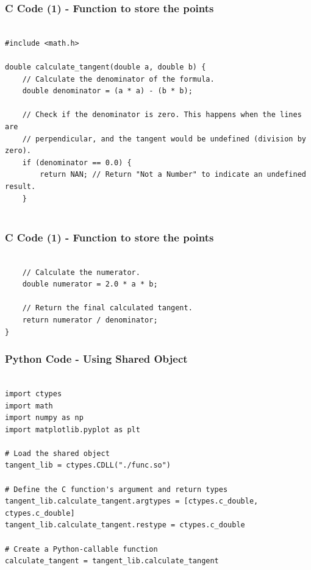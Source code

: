 \documentclass{beamer}
\begin{document}
\begin{frame}[fragile]
    \frametitle{C Code (1) - Function to store the points }

    \begin{lstlisting}

#include <math.h>

double calculate_tangent(double a, double b) {
    // Calculate the denominator of the formula.
    double denominator = (a * a) - (b * b);

    // Check if the denominator is zero. This happens when the lines are
    // perpendicular, and the tangent would be undefined (division by zero).
    if (denominator == 0.0) {
        return NAN; // Return "Not a Number" to indicate an undefined result.
    }


    \end{lstlisting}
\end{frame}

\begin{frame}[fragile]
    \frametitle{C Code (1) - Function to store the points }

    \begin{lstlisting}

    // Calculate the numerator.
    double numerator = 2.0 * a * b;

    // Return the final calculated tangent.
    return numerator / denominator;
}

    \end{lstlisting}
\end{frame}


\begin{frame}[fragile]
    \frametitle{Python Code - Using Shared Object}
    \begin{lstlisting}

import ctypes
import math
import numpy as np
import matplotlib.pyplot as plt

# Load the shared object
tangent_lib = ctypes.CDLL("./func.so")

# Define the C function's argument and return types
tangent_lib.calculate_tangent.argtypes = [ctypes.c_double, ctypes.c_double]
tangent_lib.calculate_tangent.restype = ctypes.c_double

# Create a Python-callable function
calculate_tangent = tangent_lib.calculate_tangent


\end{lstlisting}
\end{frame}
\end{document}
